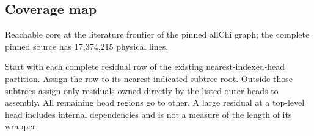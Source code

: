 \subsection{Coverage map}\label{v7:q1}

Reachable core at the literature frontier of the pinned allChi graph; the complete pinned source has 17,374,215 physical lines.

Start with each complete residual row of the existing nearest-indexed-head partition. Assign the row to its nearest indicated subtree root. Outside those subtrees assign only residuals owned directly by the listed outer heads to assembly. All remaining head regions go to other. A large residual at a top-level head includes internal dependencies and is not a measure of the length of its wrapper.

\begingroup\scriptsize\setlength{\tabcolsep}{2pt}\setlength{\emergencystretch}{2em}
